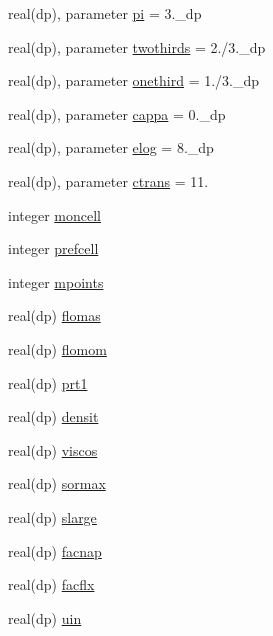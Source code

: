 \begin{DoxyCompactItemize}
\item 
real(dp), parameter \hyperlink{classparameters_aa08e5ec8fb6453fc72c9291a5a8b73fd}{pi} = 3.\-\_\-dp
\item 
real(dp), parameter \hyperlink{classparameters_aec1690016adeab2f5c099dded961c641}{twothirds} = 2./3.\-\_\-dp
\item 
real(dp), parameter \hyperlink{classparameters_aecae38d60a3a6300c7c9a09310d8e505}{onethird} = 1./3.\-\_\-dp
\item 
real(dp), parameter \hyperlink{classparameters_a896e84304cf2cdc6706c0c14f606bf18}{cappa} = 0.\-\_\-dp
\item 
real(dp), parameter \hyperlink{classparameters_a7bf1896be45b605b6ebe6d8e0fdc9362}{elog} = 8.\-\_\-dp
\item 
real(dp), parameter \hyperlink{classparameters_a85e28e166485a3b69202b759d467b578}{ctrans} = 11.
\item 
integer \hyperlink{classparameters_a56007b199efcf9e04f4073797fa63053}{moncell}
\item 
integer \hyperlink{classparameters_a7ec8b3b9060f6ad89851c62bf569b526}{prefcell}
\item 
integer \hyperlink{classparameters_a5957a9f734a0f3f197192418d8df0cf2}{mpoints}
\item 
real(dp) \hyperlink{classparameters_a020bff406c99131c634aa00296ef0217}{flomas}
\item 
real(dp) \hyperlink{classparameters_a9eccb267889b2a7e1569336f7c554b88}{flomom}
\item 
real(dp) \hyperlink{classparameters_abe40f00e086c94a111f5dadda7649d5c}{prt1}
\item 
real(dp) \hyperlink{classparameters_af5c24dcbc6cbcba3779aef88c86b5256}{densit}
\item 
real(dp) \hyperlink{classparameters_acfe414c2740060c74afa99599bdb9680}{viscos}
\item 
real(dp) \hyperlink{classparameters_add09215bd00c06360022457248fe7892}{sormax}
\item 
real(dp) \hyperlink{classparameters_a9c9d4651cc7b174f44d61b794645fde0}{slarge}
\item 
real(dp) \hyperlink{classparameters_a8830b502d3f24fd9f221f61b91de23f9}{facnap}
\item 
real(dp) \hyperlink{classparameters_a144a1abc514cf6e4fdafe51631b37801}{facflx}
\item 
real(dp) \hyperlink{classparameters_a12b29a4f3770320f45729a36df67fe2d}{uin}
\item 

\end{DoxyCompactItemize}
